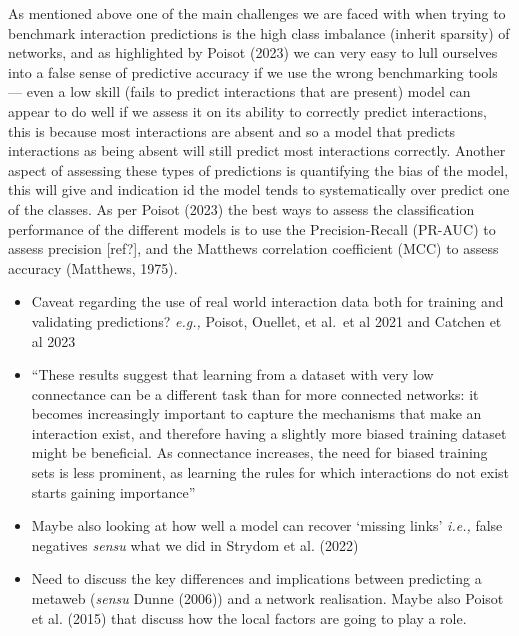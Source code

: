 \documentclass[
]{article}
\begin{document}
As mentioned above one of the main challenges we are faced with when
trying to benchmark interaction predictions is the high class imbalance
(inherit sparsity) of networks, and as highlighted by Poisot (2023) we
can very easy to lull ourselves into a false sense of predictive
accuracy if we use the wrong benchmarking tools --- even a low skill
(fails to predict interactions that are present) model can appear to do
well if we assess it on its ability to correctly predict interactions,
this is because most interactions are absent and so a model that
predicts interactions as being absent will still predict most
interactions correctly. Another aspect of assessing these types of
predictions is quantifying the bias of the model, this will give and
indication id the model tends to systematically over predict one of the
classes. As per Poisot (2023) the best ways to assess the classification
performance of the different models is to use the Precision-Recall
(PR-AUC) to assess precision {[}ref?{]}, and the Matthews correlation
coefficient (MCC) to assess accuracy (Matthews, 1975).

\begin{itemize}
\item
  Caveat regarding the use of real world interaction data both for
  training and validating predictions? \emph{e.g.,} Poisot, Ouellet, et
  al.~et al 2021 and Catchen et al 2023
\item
  ``These results suggest that learning from a dataset with very low
  connectance can be a different task than for more connected networks:
  it becomes increasingly important to capture the mechanisms that make
  an interaction exist, and therefore having a slightly more biased
  training dataset might be beneficial. As connectance increases, the
  need for biased training sets is less prominent, as learning the rules
  for which interactions do not exist starts gaining importance''
\item
  Maybe also looking at how well a model can recover `missing links'
  \emph{i.e.,} false negatives \emph{sensu} what we did in Strydom et
  al. (2022)
\item
  Need to discuss the key differences and implications between
  predicting a metaweb (\emph{sensu} Dunne (2006)) and a network
  realisation. Maybe also Poisot et al. (2015) that discuss how the
  local factors are going to play a role.
\end{itemize}
\end{document}
